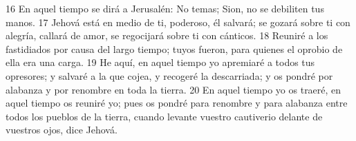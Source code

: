 16 En aquel tiempo se dirá a Jerusalén: No temas; Sion, no se debiliten tus manos.
17 Jehová está en medio de ti, poderoso, él salvará; se gozará sobre ti con alegría, callará de amor, se regocijará sobre ti con cánticos.
18 Reuniré a los fastidiados por causa del largo tiempo; tuyos fueron, para quienes el oprobio de ella era una carga.
19 He aquí, en aquel tiempo yo apremiaré a todos tus opresores; y salvaré a la que cojea, y recogeré la descarriada; y os pondré por alabanza y por renombre en toda la tierra.
20 En aquel tiempo yo os traeré, en aquel tiempo os reuniré yo; pues os pondré para renombre y para alabanza entre todos los pueblos de la tierra, cuando levante vuestro cautiverio delante de vuestros ojos, dice Jehová.

